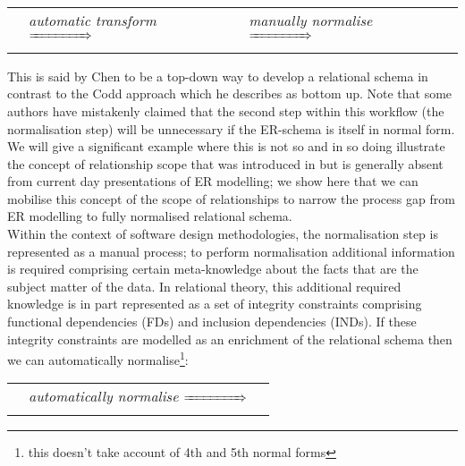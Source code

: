\documentclass[10pt,a4paper]{article}
\begin{document}
\begin{center}
\begin{tabular}{ p{1.25cm} p{1.5cm} p{1.25cm} p{1.5cm}  p{1.25cm}}
\raisebox{-0.8cm}{\parbox{1.2cm}{er schema}}& \textit{automatic transform} $\xRightarrow{\hspace*{1.5cm}}$ & \raisebox{-0.8cm}{\parbox{1.25cm}{relational schema}} & \textit{manually normalise} $ \xRightarrow{\hspace*{1.5cm}} $ & \raisebox{-0.8cm}{\parbox{1.25cm}{relational schema}} 
\end{tabular}
\end{center}
\vspace{0.2cm}
\noindent This is said by Chen to be a top-down way to develop a relational schema in contrast to the Codd approach which he describes as bottom up.
Note that some authors have mistakenly claimed that the second step within this workflow 
(the normalisation step) will be unnecessary if the ER-schema is itself in normal form. 
We will give a significant example where this is not so and in so doing illustrate the concept
of relationship scope that was  introduced in \cite{Alderson97} but is generally
absent from current day presentations of ER modelling; we show here that we can mobilise this concept of the scope of relationships to narrow the process gap from ER modelling to fully normalised relational schema.\\

\noindent Within the context of software design methodologies, the normalisation step is represented as a manual process; to perform normalisation additional information is required comprising certain meta-knowledge about the facts that are the subject matter of the data. In relational theory, this  additional required knowledge is in part represented 	as a set of integrity constraints comprising functional dependencies (FDs) and inclusion dependencies (INDs). If these integrity constraints are modelled as an enrichment of the relational schema then we can automatically normalise\footnote{this doesn't take account of 4th and 5th normal forms}:

\begin{center}
\begin{tabular}{ p{1.35cm} p{1.55cm}  p{1.25cm}}
\raisebox{-0.8cm}{\parbox{1.5cm}{relational schema  +FDs+INDs}}& \textit{automatically normalise} $\xRightarrow{\hspace*{1.5cm}}$ & \raisebox{-0.8cm}{\parbox{1.25cm}{relational schema}}  \\
\end{tabular}
\end{center}
\vspace{0.2cm}
\end{document}
